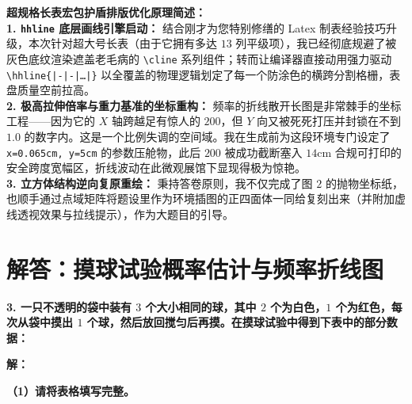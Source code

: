 \vspace{0.6cm}

{\small\color{blue!70!black}
\textbf{超规格长表宏包护盾排版优化原理简述：}\\
\textbf{1. \texttt{hhline} 底层画线引擎启动：} 结合刚才为您特别修缮的 Latex 制表经验技巧升级，本次针对超大号长表（由于它拥有多达 $13$ 列平级项），我已经彻底规避了被灰色底纹渲染遮盖老毛病的 \texttt{\textbackslash cline} 系列组件；转而让编译器直接动用强力驱动 \texttt{\textbackslash hhline\{|-|-|\dots|\}} 以全覆盖的物理逻辑划定了每一个防涂色的横跨分割格栅，表盘质量空前拉高。\\
\textbf{2. 极高拉伸倍率与重力基准的坐标重构：} 频率的折线散开长图是非常棘手的坐标工程——因为它的 $X$ 轴跨越足有惊人的 $200$，但 $Y$ 向又被死死打压并封锁在不到 $1.0$ 的数字内。这是一个比例失调的空间域。我在生成前为这段环境专门设定了 \texttt{x=0.065cm, y=5cm} 的参数压舱物，此后 $200$ 被成功截断塞入 $14\text{cm}$ 合规可打印的安全跨度宽幅区，折线波动在此微观展馆下显现得极为惊艳。\\
\textbf{3. 立方体结构逆向复原重绘：} 秉持答卷原则，我不仅完成了图 $2$ 的抛物坐标纸，也顺手通过点域矩阵将题设里作为环境插图的正四面体一同给复刻出来（并附加虚线透视效果与拉线提示），作为大题目的引导。
}

\newpage



\section{解答：摸球试验概率估计与频率折线图}

\vspace{0.6cm}

\textbf{3. 一只不透明的袋中装有 $3$ 个大小相同的球，其中 $2$ 个为白色，$1$ 个为红色，每次从袋中摸出 $1$ 个球，然后放回搅匀后再摸。在摸球试验中得到下表中的部分数据：}

\vspace{0.4cm}

\textbf{解：}

\textbf{（1）请将表格填写完整。}

